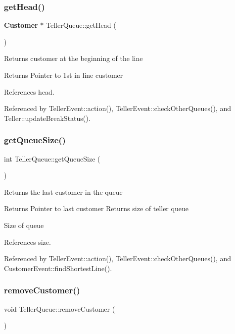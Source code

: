 \subsubsection{get\+Head()}
{\footnotesize\ttfamily \textbf{ Customer} $\ast$ Teller\+Queue\+::get\+Head (\begin{DoxyParamCaption}{ }\end{DoxyParamCaption})}

Returns customer at the beginning of the line \begin{DoxyReturn}{Returns}
Pointer to 1st in line customer 
\end{DoxyReturn}


References head.



Referenced by Teller\+Event\+::action(), Teller\+Event\+::check\+Other\+Queues(), and Teller\+::update\+Break\+Status().

\mbox{\label{classTellerQueue_a0e485ce24683a195a6a11cb60a4768cd}} 
\subsubsection{get\+Queue\+Size()}
{\footnotesize\ttfamily int Teller\+Queue\+::get\+Queue\+Size (\begin{DoxyParamCaption}{ }\end{DoxyParamCaption})}

Returns the last customer in the queue \begin{DoxyReturn}{Returns}
Pointer to last customer Returns size of teller queue 

Size of queue 
\end{DoxyReturn}


References size.



Referenced by Teller\+Event\+::action(), Teller\+Event\+::check\+Other\+Queues(), and Customer\+Event\+::find\+Shortest\+Line().

\mbox{\label{classTellerQueue_a5b434bf3e228ea742d21bdbed256d20e}} 
\subsubsection{remove\+Customer()}
{\footnotesize\ttfamily void Teller\+Queue\+::remove\+Customer (\begin{DoxyParamCaption}{ }\end{DoxyParamCaption})}


